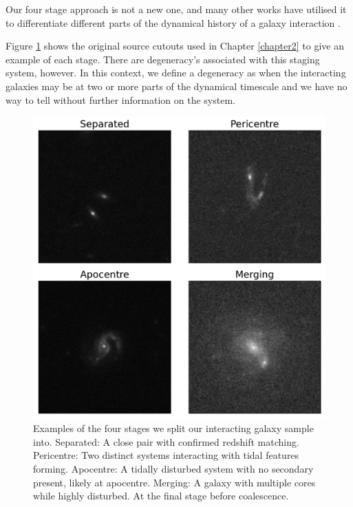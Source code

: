 \noindent Our four stage approach is not a new one, and many other works have utilised it to differentiate different parts of the dynamical history of a galaxy interaction \citep[e.g][]{2022ApJ...937...97C, 2023ApJ...952..122G}.

Figure \ref{fig:stages} shows the original source cutouts used in Chapter \ref{chapter2} to give an example of each stage. There are degeneracy's associated with this staging system, however. In this context, we define a degeneracy as when the interacting galaxies may be at two or more parts of the dynamical timescale and we have no way to tell without further information on the system.

\begin{figure}
\centering
\includegraphics[width=\textwidth]{Chapter3/figures/examples-stages.pdf}
\caption[Examples of the four stages we split our interacting galaxy sample into.]{Examples of the four stages we split our interacting galaxy sample into. Separated: A close pair with confirmed redshift matching. Pericentre: Two distinct systems interacting with tidal features forming. Apocentre: A tidally disturbed system with no secondary present, likely at apocentre. Merging: A galaxy with multiple cores while highly disturbed. At the final stage before coalescence.}
\label{fig:stages}
\end{figure}

